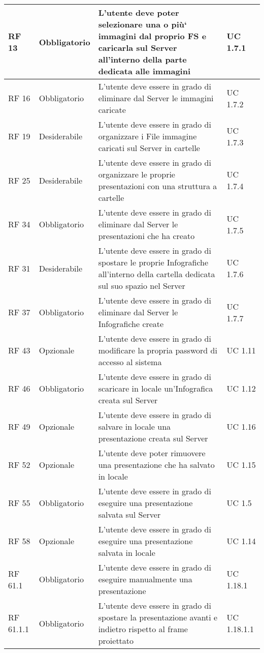 {\begin{longtable} [c]{| p{2.5cm} | p{2.5cm} | p{6cm} |p{2.5cm}|}
		\hline
		RF 13 & Obbligatorio & L’utente deve poter selezionare una o più` immagini dal proprio FS e caricarla sul Server\ped{g} all’interno della parte dedicata alle immagini & UC 1.7.1\\
		\hline
		RF 16 & Obbligatorio & L’utente deve essere in grado di eliminare dal Server\ped{g} le immagini caricate & UC 1.7.2\\			
		\hline
		RF 19 & Desiderabile & L'utente deve essere in grado di organizzare i File\ped{g} immagine caricati sul Server\ped{g} in cartelle & UC 1.7.3\\
		\hline
		RF 25 & Desiderabile & L'utente deve essere in grado di organizzare le proprie presentazioni con una struttura a cartelle & UC 1.7.4\\
		\hline
		RF 34 & Obbligatorio & L’utente deve essere in grado di eliminare dal Server\ped{g} le presentazioni che ha creato  & UC 1.7.5\\
		\hline
		RF 31 & Desiderabile & L'utente deve essere in grado di spostare le proprie Infografiche\ped{g} all’interno della cartella dedicata sul suo spazio nel Server\ped{g} & UC 1.7.6\\
		\hline
		RF 37 & Obbligatorio & L’utente deve essere in grado di eliminare dal Server\ped{g} le Infografiche\ped{g} create & UC 1.7.7\\
		\hline
		RF 43 & Opzionale & L'utente deve essere in grado di modificare la propria password di accesso al sistema & UC 1.11\\						
		\hline
		RF 46 & Obbligatorio & L'utente deve essere in grado di scaricare in locale un’Infografica\ped{g} creata sul Server\ped{g} & UC 1.12\\
		\hline
		RF 49 & Opzionale & L'utente deve essere in grado di salvare in locale una presentazione creata sul Server\ped{g} & UC 1.16\\
		\hline
		RF 52 & Opzionale & L’utente deve poter rimuovere una presentazione che ha salvato in locale & UC 1.15\\
		\hline
		RF 55 & Obbligatorio & L'utente deve essere in grado di eseguire una presentazione salvata sul Server\ped{g} & UC 1.5\\
		\hline
		RF 58 & Opzionale & L'utente deve essere in grado di eseguire una presentazione salvata in locale & UC 1.14\\
		\hline
		RF 61.1 & Obbligatorio & L'utente deve essere in grado di eseguire manualmente una presentazione & UC 1.18.1\\
		\hline
		RF 61.1.1 & Obbligatorio & L'utente deve essere in grado di spostare la presentazione avanti e indietro rispetto al frame\ped{g} proiettato & UC 1.18.1.1\\

\end{longtable}}
